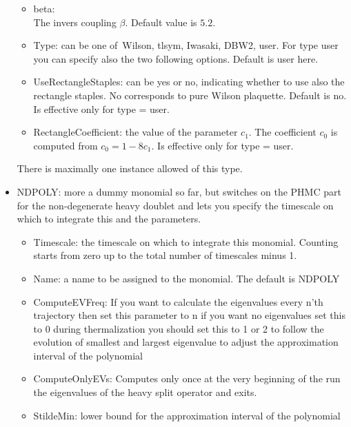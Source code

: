 \begin{itemize}
\begin{itemize}
  \item {\ttfamily beta}:\\
    The invers coupling $\beta$. Default value is $5.2$.
    
  \item {\ttfamily Type}: can be one of\ {\ttfamily Wilson, tlsym,
      Iwasaki, DBW2, user}. For type user you can specify also the two
    following options. Default is {\ttfamily user} here.
  \item {\ttfamily UseRectangleStaples}: can be yes or no, indicating
    whether to use also the rectangle staples. No corresponds to pure
    Wilson plaquette. Default is no. Is effective only for {\ttfamily
      type = user}.
  \item {\ttfamily RectangleCoefficient}: the value of the parameter
    $c_1$. The coefficient $c_0$ is computed from $c_0 = 1-8c_1$. Is
    effective only for {\ttfamily type = user}.
  \end{itemize}
  There is maximally one instance allowed of this type.


\item {\ttfamily NDPOLY}: more a dummy monomial so far, but switches
  on the PHMC part for the non-degenerate heavy doublet and lets you
  specify the timescale on which to integrate this and the parameters.
  \begin{itemize}

  \item {\ttfamily Timescale}: the timescale on which to integrate
    this monomial. Counting starts from zero up to the total number of
    timescales minus 1.

  \item {\ttfamily Name}: a name to be assigned to the monomial. The
    default is {\ttfamily NDPOLY}

  \item {\ttfamily ComputeEVFreq}:
    If you want to calculate the eigenvalues every n'th trajectory
    then set this parameter to n if you want no eigenvalues set this to 0
    during thermalization you should set this to 1 or 2 to follow the evolution
    of smallest and largest eigenvalue to adjust the approximation interval
    of the polynomial

  \item {\ttfamily ComputeOnlyEVs}: Computes only once at the very
    beginning of the run the eigenvalues of the heavy split operator
    and exits.

  \item {\ttfamily StildeMin}: lower bound for the approximation interval of the polynomial


\end{itemize}
\end{itemize}
